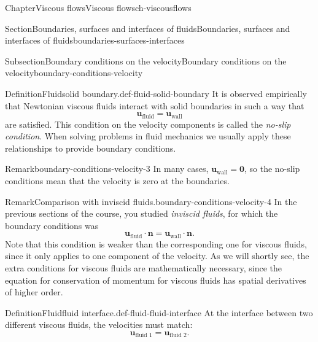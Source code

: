 \documentclass[oneside,10pt,]{book}
\newcommand{\ptxlistdisc}{\raisebox{0.3ex}{\textbullet}}
\numberwithin{equation}{section}
\newcommand{\bn}{\boldsymbol{n}}
\newcommand{\bu}{\boldsymbol{u}}
\begin{document}
\begin{chapterptx}{Chapter}{Viscous flows}{}{Viscous flows}{}{}{ch-viscousflows}
\begin{sectionptx}{Section}{Boundaries, surfaces and interfaces of fluids}{}{Boundaries, surfaces and interfaces of fluids}{}{}{boundaries-surfaces-interfaces}
\begin{introduction}{}
\begin{itemize}[label=\ptxlistdisc]
\end{itemize}
%
\end{introduction}%
%
%
\typeout{************************************************}
\typeout{************************************************}
%
\begin{subsectionptx}{Subsection}{Boundary conditions on the velocity}{}{Boundary conditions on the velocity}{}{}{boundary-conditions-velocity}
\begin{definition}{Definition}{Fluid\textendash{}solid boundary.}{}{def-fluid-solid-boundary}%
It is observed empirically that Newtonian viscous fluids interact with solid boundaries in such a way that%
\begin{equation*}
\bu_{\textrm{fluid}} = \bu_{\textrm{wall}}
\end{equation*}
are satisfied. This condition on the velocity components is called the \emph{no-slip condition}. When solving problems in fluid mechanics we usually apply these relationships to provide boundary conditions.%
\end{definition}
\begin{remark}{Remark}{}{boundary-conditions-velocity-3}%
In many cases, \(\bu_{\textrm{wall}} = \boldsymbol{0}\), so the no-slip conditions mean that the velocity is zero at the boundaries.%
\end{remark}
\begin{remark}{Remark}{Comparison with inviscid fluids.}{boundary-conditions-velocity-4}%
In the previous sections of the course, you studied \emph{inviscid fluids}, for which the boundary conditions was%
\begin{equation*}
\bu_{\textrm{fluid}}\cdot\bn=\bu_{\textrm{wall}}\cdot\bn.
\end{equation*}
Note that this condition is weaker than the corresponding one for viscous fluids, since it only applies to one component of the velocity. As we will shortly see, the extra conditions for viscous fluids are mathematically necessary, since the equation for conservation of momentum for viscous fluids has spatial derivatives of higher order.%
\end{remark}
\begin{definition}{Definition}{Fluid\textendash{}fluid interface.}{}{def-fluid-fluid-interface}%
At the interface between two different viscous fluids, the velocities must match:%
\begin{equation*}
\bu_{\textrm{fluid 1}} = \bu_{\textrm{fluid 2}}.
\end{equation*}

\end{definition}
\end{subsectionptx}
\end{sectionptx}
\end{chapterptx}
\end{document}
